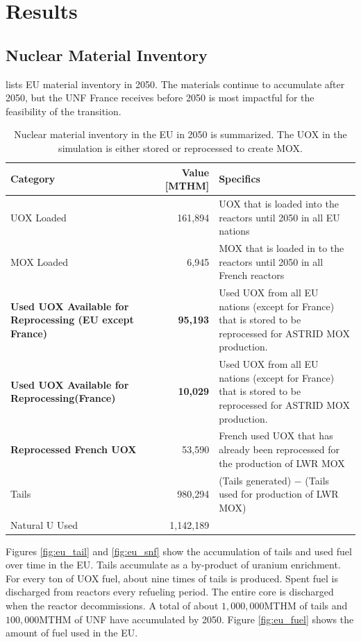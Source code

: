 \section{Results}

\subsection{Nuclear Material Inventory}

 lists \gls{EU} material inventory in 2050.
The materials continue to accumulate after 2050, but the
\gls{UNF} France receives before 2050 is most impactful for the
feasibility of the transition.


\begin{table}[h]
	\centering
	\caption{Nuclear material inventory in the \gls{EU} in 2050 is
                  summarized. The \gls{UOX} in the simulation is either stored or reprocessed to create \gls{MOX}.}

		\begin{tabular}{lrl}
			\hline
			\textbf{Category} & \textbf{Value [MTHM]} & Specifics \\ \hline
			UOX Loaded  & 161,894 & UOX that is loaded into the reactors until 2050 in all EU nations \\ 
			MOX Loaded  & 6,945  & MOX that is loaded in to the reactors until 2050 in all French reactors \\ 
			\textbf{Used UOX Available for Reprocessing (EU except France)}  & \textbf{95,193}  & Used UOX from all EU nations (except for France) that is stored to be reprocessed for ASTRID MOX production.\\
			\textbf{Used UOX Available for Reprocessing(France)} & \textbf{10,029}  & Used UOX from all EU nations (except for France) that is stored to be reprocessed for ASTRID MOX production. \\
			\textbf{Reprocessed French UOX} & 53,590 & French used UOX that has already been reprocessed for the production of LWR MOX \\
			Tails  & 980,294  & (Tails generated) $-$ (Tails used for production of LWR MOX) \\ 
			Natural U Used  & 1,142,189  & \\ \hline
		\end{tabular}
		
		\label{tab:sim_result1}
\end {table}
\FloatBarrier


Figures \ref{fig:eu_tail} and \ref{fig:eu_snf} show the 
accumulation of tails and used fuel over time in the \gls{EU}.
Tails accumulate as a by-product of uranium enrichment. For every
ton of \gls{UOX} fuel, about nine times of tails is produced. 
Spent fuel is discharged from reactors every refueling period.
The entire core is discharged when the reactor decommissions.
A total of about $1,000,000$MTHM of tails and $100,000$MTHM of
\gls{UNF} have accumulated by 2050.
Figure \ref{fig:eu_fuel} shows the amount of fuel used in the \gls{EU}.


